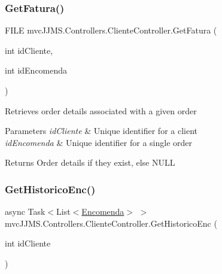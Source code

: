 \subsubsection{\texorpdfstring{Get\+Fatura()}{GetFatura()}}
{\footnotesize\ttfamily F\+I\+LE mvc\+J\+J\+M\+S.\+Controllers.\+Cliente\+Controller.\+Get\+Fatura (\begin{DoxyParamCaption}\item[{int}]{id\+Cliente,  }\item[{int}]{id\+Encomenda }\end{DoxyParamCaption})\hspace{0.3cm}{\ttfamily [inline]}}



Retrieves order details associated with a given order 


\begin{DoxyParams}{Parameters}
{\em id\+Cliente} & Unique identifier for a client\\
\hline
{\em id\+Encomenda} & Unique identifier for a single order\\
\hline
\end{DoxyParams}
\begin{DoxyReturn}{Returns}
Order details if they exist, else N\+U\+LL
\end{DoxyReturn}
\mbox{\label{classmvc_j_j_m_s_1_1_controllers_1_1_cliente_controller_a2023d96fe1797ec7673210da1233dfe2}} 
\subsubsection{\texorpdfstring{Get\+Historico\+Enc()}{GetHistoricoEnc()}}
{\footnotesize\ttfamily async Task$<$List$<$\mbox{\hyperlink{classmvc_j_j_m_s_1_1_models_1_1_encomenda}{Encomenda}}$>$ $>$ mvc\+J\+J\+M\+S.\+Controllers.\+Cliente\+Controller.\+Get\+Historico\+Enc (\begin{DoxyParamCaption}\item[{int}]{id\+Cliente }\end{DoxyParamCaption})\hspace{0.3cm}{\ttfamily [inline]}}



